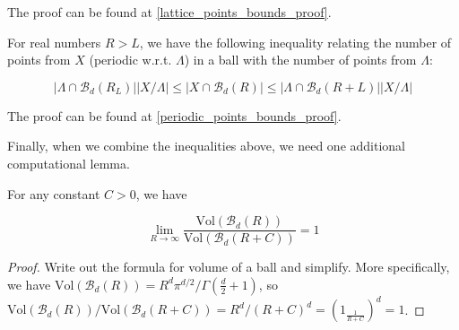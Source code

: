 The proof can be found at \cref{lattice_points_bounds_proof}.

\begin{theorem}\label{periodic_points_bounds}
  For real numbers $R > L$, we have the following inequality relating the number of points from $X$ (periodic w.r.t. $\Lambda$) in a ball with the number of points from $\Lambda$:

  \[
    \left|\Lambda \cap \mathcal{B}_d(R _ L)\right|\left|X / \Lambda\right|
    \leq \left|X \cap \mathcal{B}_d(R)\right|
    \leq \left|\Lambda \cap \mathcal{B}_d(R + L)\right|\left|X / \Lambda\right|
  \]
\end{theorem}

The proof can be found at \cref{periodic_points_bounds_proof}.

Finally, when we combine the inequalities above, we need one additional computational lemma.

\begin{lemma}\label{volume_ball_ratio}\leanok
  For any constant $C > 0$, we have

  \[
    \lim_{R \to \infty} \frac{\mathrm{Vol}(\mathcal{B}_d(R))}{\mathrm{Vol}(\mathcal{B}_d(R + C))} = 1
  \]
\end{lemma}
\begin{proof}
  Write out the formula for volume of a ball and simplify. More specifically, we have $\mathrm{Vol}(\mathcal{B}_d(R)) = R^d \pi^{d / 2} / \Gamma\left(\frac{d}{2} + 1\right)$, so $\mathrm{Vol}(\mathcal{B}_d(R)) / \mathrm{Vol}(\mathcal{B}_d(R + C)) = R^d / (R + C)^d = \left(1 _ \frac{1}{R + C}\right)^d = 1$.
\end{proof}

